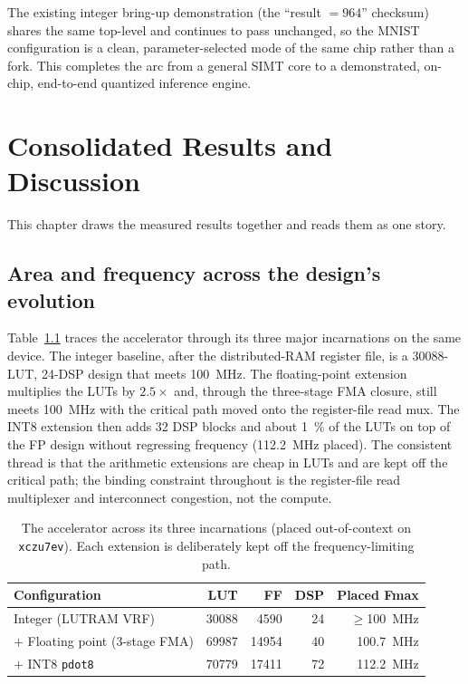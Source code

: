 \documentclass[12pt,a4paper,oneside]{report}
\newcommand{\code}[1]{\texttt{#1}}
\begin{document}
The existing integer bring-up demonstration (the ``result $=964$'' checksum) shares
the same top-level and continues to pass unchanged, so the MNIST configuration is a
clean, parameter-selected mode of the same chip rather than a fork. This completes
the arc from a general SIMT core to a demonstrated, on-chip, end-to-end quantized
inference engine.

\chapter{Consolidated Results and Discussion}
\label{ch:results}

This chapter draws the measured results together and reads them as one story.

\section{Area and frequency across the design's evolution}
Table~\ref{tab:evolution} traces the accelerator through its three major
incarnations on the same device. The integer baseline, after the distributed-RAM
register file, is a \num{30088}-LUT, \num{24}-DSP design that meets
\SI{100}{\mega\hertz}. The floating-point extension multiplies the LUTs by
$2.5\times$ and, through the three-stage FMA closure, still meets
\SI{100}{\mega\hertz} with the critical path moved onto the register-file read
mux. The INT8 extension then adds \num{32} DSP blocks and about \SI{1}{\percent}
of the LUTs on top of the FP design without regressing frequency
(\SI{112.2}{\mega\hertz} placed). The consistent thread is that the arithmetic
extensions are cheap in LUTs and are kept off the critical path; the binding
constraint throughout is the register-file read multiplexer and interconnect
congestion, not the compute.

\begin{table}[t]
\caption{The accelerator across its three incarnations (placed out-of-context on
\code{xczu7ev}). Each extension is deliberately kept off the frequency-limiting
path.}
\label{tab:evolution}
\centering
\small
\begin{tabular}{lrrrr}
\toprule
Configuration & LUT & FF & DSP & Placed Fmax\\
\midrule
Integer (LUTRAM VRF)      & \num{30088} & \num{4590}  & 24 & $\ge$100~MHz\\
$+$ Floating point (3-stage FMA) & \num{69987} & \num{14954} & 40 & 100.7~MHz\\
$+$ INT8 \code{pdot8}     & \num{70779} & \num{17411} & 72 & 112.2~MHz\\
\bottomrule
\end{tabular}
\end{table}
\end{document}
